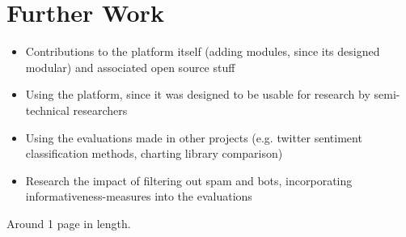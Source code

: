 \chapter{Further Work}
\label{ch:furtherWork}

\begin{itemize}
    \item
    Contributions to the platform itself (adding modules, since its designed modular) and associated open source stuff
    \item
    Using the platform, since it was designed to be usable for research by semi-technical researchers
    \item
    Using the evaluations made in other projects (e.g. twitter sentiment classification methods, charting library comparison)
    \item
    Research the impact of filtering out spam and bots, incorporating informativeness-measures into the evaluations

\end{itemize}

Around 1 page in length.
\pagebreak[1]